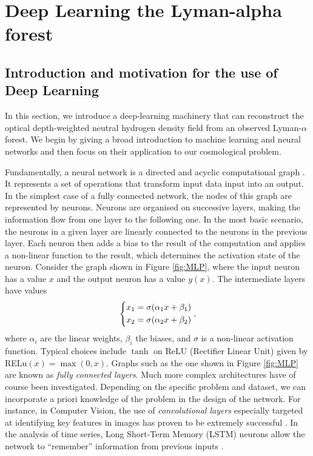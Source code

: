 \chapter{Deep Learning the Lyman-alpha forest}
\label{chap: deep learning}




\section{Introduction and motivation for the use of Deep Learning}
\label{sec:motiv_ml}
In this section, we introduce a deep-learning machinery that can reconstruct the optical depth-weighted neutral hydrogen density field from an observed Lyman-$\alpha$ forest. We begin by giving a broad introduction to machine learning and neural networks and then focus on their application to our cosmological problem. 

Fundamentally, a neural network is a directed and acyclic computational graph \cite{LeCun2015}. It represents a set of operations that transform input data input into an output. In the simplest case of a fully connected network, the nodes of this graph are represented by neurons. Neurons are organised on successive layers, making the information flow from one layer to the following one. In the most basic scenario, the neurons in a given layer are linearly connected to the neurons in the previous layer. Each neuron then adds a bias to the result of the computation and applies a non-linear function to the result, which determines the activation state of the neuron. Consider the graph shown in Figure \ref{fig:MLP}, where the input neuron has a value $x$ and the output neuron has a value $y(x)$. The intermediate layers have values
\begin{equation}
    \begin{dcases}
        x_1=\sigma(\alpha_1 x+\beta_1)\\
        x_2=\sigma(\alpha_2 x+\beta_2)
    \end{dcases},
\end{equation}
where $\alpha_i$ are the linear weights, $\beta_i$ the biases, and $\sigma$ is a non-linear activation function. Typical choices include $\tanh{}$ on ReLU (Rectifier Linear Unit) given by RELu$(x)=\max(0,x)$. Graphs such as the one shown in Figure \ref{fig:MLP} are known as \emph{fully connected layers}. Much more complex architectures have of course been investigated. Depending on the specific problem and dataset, we can incorporate a priori knowledge of the problem in the design of the network. For instance, in Computer Vision, the use of \emph{convolutional layers} especially targeted at identifying key features in images has proven to be extremely successful \cite{CNN_rev}. In the analysis of time series, Long Short-Term Memory (LSTM) neurons allow the network to ``remember'' information from previous inputs \cite{LSTM_rev}. 




